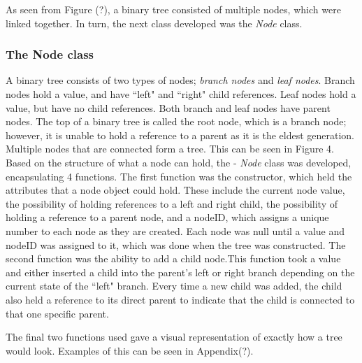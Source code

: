 \documentclass[11pt]{article}
\begin{document}
As seen from Figure (?), a binary tree consisted of multiple nodes, which were linked together. In turn, the next class  developed was the \textit{Node} class. 
\subsubsection{The Node class}\label{subsubsec:node}
 A binary tree consists of two types of nodes; \textit{branch nodes} and \textit{leaf nodes}. Branch nodes hold a value, and have ``left" and ``right" child references. Leaf nodes hold a value, but have no child references. Both branch and leaf nodes have parent nodes. The top of a binary tree is called the root node, which is a branch node; however, it is unable to hold a reference to a parent as it is the eldest generation. Multiple nodes that are connected form a tree. This can be seen in Figure 4.  \\
Based on the structure of what a node can hold, the - \textit{Node} class was developed, encapsulating 4 functions. The first function was the constructor, which held the attributes that a node object could hold. These include the current node value, the possibility of holding references to a left and right child, the possibility of holding a reference to a parent node, and a nodeID, which assigns a unique number to each node as they are created.
Each node was null until a value and nodeID was assigned to it, which was done when the tree was constructed. The second function was the ability to add a child node.This function took a value and either inserted a child into the parent's left or right branch depending on the current state of the ``left" branch. Every time a new child was added, the child also held a reference to its direct parent to indicate that the child is connected to that one specific parent.
 
The final two functions used gave a visual representation of exactly how a tree would look. Examples of this can be seen in Appendix(?). 
\end{document}
